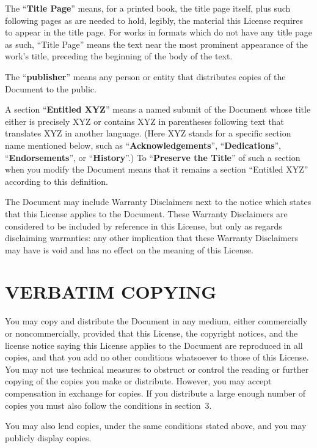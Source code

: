 The ``\textbf{Title Page}'' means, for a printed book, the title page itself,
plus such following pages as are needed to hold, legibly, the material
this License requires to appear in the title page.  For works in
formats which do not have any title page as such, ``Title Page'' means
the text near the most prominent appearance of the work's title,
preceding the beginning of the body of the text.

The ``\textbf{publisher}'' means any person or entity that distributes
copies of the Document to the public.

A section ``\textbf{Entitled XYZ}'' means a named subunit of the Document whose
title either is precisely XYZ or contains XYZ in parentheses following
text that translates XYZ in another language.  (Here XYZ stands for a
specific section name mentioned below, such as ``\textbf{Acknowledgements}'',
``\textbf{Dedications}'', ``\textbf{Endorsements}'', or ``\textbf{History}''.)
To ``\textbf{Preserve the Title}''
of such a section when you modify the Document means that it remains a
section ``Entitled XYZ'' according to this definition.

The Document may include Warranty Disclaimers next to the notice which
states that this License applies to the Document.  These Warranty
Disclaimers are considered to be included by reference in this
License, but only as regards disclaiming warranties: any other
implication that these Warranty Disclaimers may have is void and has
no effect on the meaning of this License.


\section{VERBATIM COPYING}

You may copy and distribute the Document in any medium, either
commercially or noncommercially, provided that this License, the
copyright notices, and the license notice saying this License applies
to the Document are reproduced in all copies, and that you add no other
conditions whatsoever to those of this License.  You may not use
technical measures to obstruct or control the reading or further
copying of the copies you make or distribute.  However, you may accept
compensation in exchange for copies.  If you distribute a large enough
number of copies you must also follow the conditions in section~3.

You may also lend copies, under the same conditions stated above, and
you may publicly display copies.


